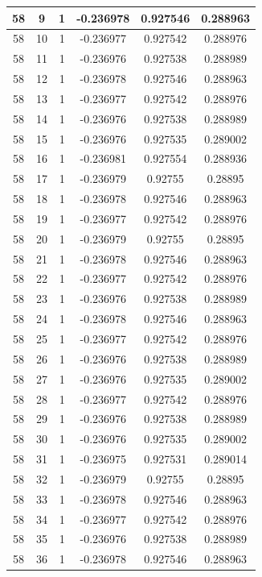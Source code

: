 \documentclass[12pt,a4paper]{article}
\numberwithin{equation}{section}
\numberwithin{figure}{section}
\numberwithin{table}{section}
\begin{document}
\begin{longtable}{|c|c|c|c|c|c|}
58 & 9 & 1 & -0.236978 & 0.927546 & 0.288963 \\ \hline
58 & 10 & 1 & -0.236977 & 0.927542 & 0.288976 \\ \hline
58 & 11 & 1 & -0.236976 & 0.927538 & 0.288989 \\ \hline
58 & 12 & 1 & -0.236978 & 0.927546 & 0.288963 \\ \hline
58 & 13 & 1 & -0.236977 & 0.927542 & 0.288976 \\ \hline
58 & 14 & 1 & -0.236976 & 0.927538 & 0.288989 \\ \hline
58 & 15 & 1 & -0.236976 & 0.927535 & 0.289002 \\ \hline
58 & 16 & 1 & -0.236981 & 0.927554 & 0.288936 \\ \hline
58 & 17 & 1 & -0.236979 & 0.92755 & 0.28895 \\ \hline
58 & 18 & 1 & -0.236978 & 0.927546 & 0.288963 \\ \hline
58 & 19 & 1 & -0.236977 & 0.927542 & 0.288976 \\ \hline
58 & 20 & 1 & -0.236979 & 0.92755 & 0.28895 \\ \hline
58 & 21 & 1 & -0.236978 & 0.927546 & 0.288963 \\ \hline
58 & 22 & 1 & -0.236977 & 0.927542 & 0.288976 \\ \hline
58 & 23 & 1 & -0.236976 & 0.927538 & 0.288989 \\ \hline
58 & 24 & 1 & -0.236978 & 0.927546 & 0.288963 \\ \hline
58 & 25 & 1 & -0.236977 & 0.927542 & 0.288976 \\ \hline
58 & 26 & 1 & -0.236976 & 0.927538 & 0.288989 \\ \hline
58 & 27 & 1 & -0.236976 & 0.927535 & 0.289002 \\ \hline
58 & 28 & 1 & -0.236977 & 0.927542 & 0.288976 \\ \hline
58 & 29 & 1 & -0.236976 & 0.927538 & 0.288989 \\ \hline
58 & 30 & 1 & -0.236976 & 0.927535 & 0.289002 \\ \hline
58 & 31 & 1 & -0.236975 & 0.927531 & 0.289014 \\ \hline
58 & 32 & 1 & -0.236979 & 0.92755 & 0.28895 \\ \hline
58 & 33 & 1 & -0.236978 & 0.927546 & 0.288963 \\ \hline
58 & 34 & 1 & -0.236977 & 0.927542 & 0.288976 \\ \hline
58 & 35 & 1 & -0.236976 & 0.927538 & 0.288989 \\ \hline
58 & 36 & 1 & -0.236978 & 0.927546 & 0.288963 \\ \hline

\end{longtable}
\end{document}
